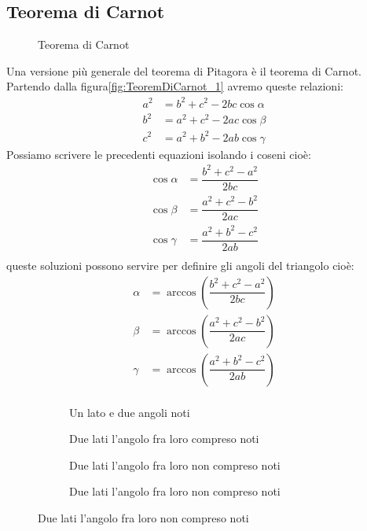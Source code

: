 \subsection{Teorema di Carnot}
\begin{figure}
	\centering
	
	\caption{Teorema di Carnot}
	\label{fig:TeoremDiCarnot_1}
\end{figure}
Una versione più generale del teorema di Pitagora è il teorema di Carnot. Partendo dalla figura\nobs\vref{fig:TeoremDiCarnot_1} avremo queste relazioni:
\begin{align*}
a^2&=b^2+c^2-2bc\cos\alpha\\
b^2&=a^2+c^2-2ac\cos\beta\\
c^2&=a^2+b^2-2ab\cos\gamma
\end{align*}
Possiamo scrivere le precedenti equazioni isolando i coseni cioè:
\begin{align*}
\cos\alpha&=\dfrac{b^2+c^2-a^2}{2bc}\\
\cos\beta&=\dfrac{a^2+c^2-b^2}{2ac}\\
\cos\gamma&=\dfrac{a^2+b^2-c^2}{2ab}\\
\end{align*}
queste soluzioni possono servire per definire gli angoli del triangolo cioè:
\begin{align*}
\alpha&=\arccos(\dfrac{b^2+c^2-a^2}{2bc})\\
\beta&=\arccos(\dfrac{a^2+c^2-b^2}{2ac})\\
\gamma&=\arccos(\dfrac{a^2+b^2-c^2}{2ab})\\
\end{align*}
\begin{figure}
	\begin{subfigure}[b]{.5\linewidth}
		\centering

	\caption{Un lato e due angoli noti}
	\label{fig:risTriangQqualunque_1}
	\end{subfigure}%
	\begin{subfigure}[b]{.5\linewidth}
		\centering
	
		\caption{Due lati l'angolo fra loro compreso noti}
		\label{fig:risTriangQqualunque_2}
	\end{subfigure}
	\begin{subfigure}[b]{.5\linewidth}
		\centering
		
		\caption{Due lati l'angolo fra loro non compreso noti}
		\label{fig:risTriangQqualunque_3}
	\end{subfigure}%
	\begin{subfigure}[b]{.5\linewidth}
		\centering
		
		\caption{Due lati l'angolo fra loro non compreso noti}
		\label{fig:risTriangQqualunque_4}
	\end{subfigure}
	\label{fig:RisoluzioneTriangoliQualunque}
\end{figure}
